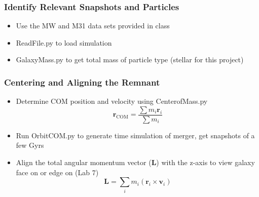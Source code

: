 \documentclass[usenatbib]{mnras}
\begin{document}
\subsubsection{Identify Relevant Snapshots and Particles}
\begin{itemize}
    \item Use the MW and M31 data sets provided in class
    \item ReadFile.py to load simulation
    \item GalaxyMass.py to get total mass of particle type (stellar for this project)
\end{itemize}

\subsubsection{Centering and Aligning the Remnant}
\begin{itemize}
    \item Determine COM position and velocity using CenterofMass.py
    \[
\mathbf{r}_{\text{COM}} = \frac{\sum m_i \mathbf{r}_i}{\sum m_i}
\]
    \item Run OrbitCOM.py to generate time simulation of merger, get snapshots of a few Gyrs
    \item Align the total angular momentum vector (\(\mathbf{L}\)) with the z-axis to view galaxy face on or edge on (Lab 7)
  \[
  \mathbf{L} = \sum_i m_i (\mathbf{r}_i \times \mathbf{v}_i)
  \]
\end{itemize}
\end{document}
